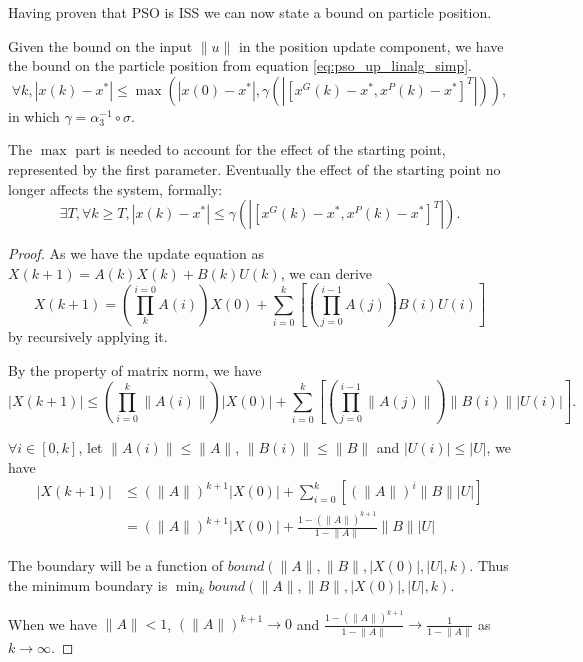 Having proven that PSO is ISS we can now state a bound on particle position.

\begin{mythm}
\label{coro:state_bound}
Given the bound on the input $ \lVert u \rVert $ in the position update component, we have the bound on the particle position from equation \eqref{eq:pso_up_linalg_simp}.
\begin{equation}
\label{eq:state_bound}
\forall k, 
| x(k) - x^{*} | \leq \max ( | x(0) - x^{*} | , \gamma ( | [ x^{G}(k) - x^{*}, x^{P}(k) - x^{*} ]^{T} | ) ),
\end{equation}
in which $ \gamma = \alpha_{3}^{-1} \circ \sigma $.

The $ \max $ part is needed to account for the effect of the starting point, represented by the first parameter. Eventually the effect of the starting point no longer affects the system, formally:
\begin{equation}
\label{eq:state_bound:conv}
\exists T, \forall k \geq T, 
|  x(k) - x^{*} | \leq \gamma ( | [ x^{G}(k) - x^{*}, x^{P}(k) - x^{*} ]^{T} | ).
\end{equation}
\begin{proof}
As we have the update equation as
$ X(k+1) = A(k) X(k) + B(k) U(k) $, we can derive 
\begin{equation}
X(k+1) = ( \prod_{k}^{i=0} A(i) ) X(0) + \sum_{i=0}^{k} [ ( \prod_{j=0}^{i-1} A(j) ) B(i) U(i)  ] 
\end{equation}
by recursively applying it.

By the property of matrix norm, we have
\begin{equation}
| X(k+1) | \leq ( \prod_{i=0}^{k} \lVert A(i) \rVert ) | X(0) | + \sum_{i=0}^{k} [ ( \prod_{j=0}^{i-1} \lVert A(j) \rVert ) \lVert B(i) \rVert | U(i) |  ].
\end{equation}

$ \forall i \in [0, k] $, let $ \lVert A(i) \rVert \leq \lVert A \rVert $, $  \lVert B(i) \rVert \leq \lVert B \rVert $ and $ | U(i) | \leq | U | $, we have
\begin{equation}
\label{eq:bound:final}
\begin{aligned}
| X(k+1) | & \leq ( \lVert A \rVert )^{k+1} | X(0) | + \sum_{i=0}^{k} [ ( \lVert A \rVert )^{i} \lVert B \rVert | U |  ] \\
& = ( \lVert A \rVert )^{k+1} | X(0) | + \frac{1 - ( \lVert A \rVert )^{k+1} }{1 - \lVert A \rVert }  \lVert B \rVert | U |
\end{aligned}
\end{equation}

The boundary will be a function of $ bound ( \lVert A \rVert, \lVert B \rVert, | X(0) |, | U |, k ) $.
Thus the minimum boundary is $ \min_{k} bound ( \lVert A \rVert, \lVert B \rVert, | X(0) |, | U |, k ) $.

When we have $ \lVert A \rVert < 1 $, 
$ ( \lVert A \rVert )^{k+1} \rightarrow 0 $ and
$ \frac{1 - (\lVert A \rVert )^{k+1} }{1 - \lVert A \rVert} \rightarrow \frac{1}{1 - \lVert A \rVert } $
as $ k \rightarrow \infty $.
\end{proof}
\end{mythm}

